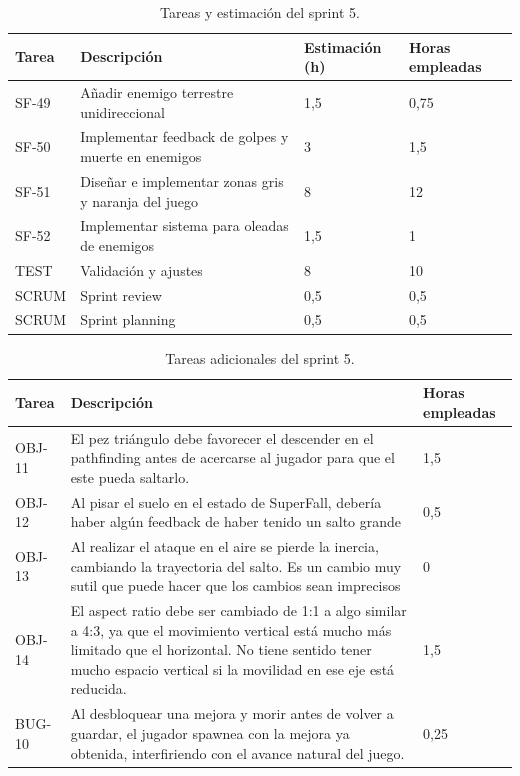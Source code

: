 \begin{table}[!ht]
    \centering
    \begin{tabular}{|l|p{8cm}|p{2cm}|p{2cm}|}
    \hline
        Tarea & Descripción & Estimación (h) & Horas empleadas \\ \hline
        SF-49 & Añadir enemigo terrestre unidireccional & 1,5 & 0,75 \\ \hline
        SF-50 & Implementar feedback de golpes y muerte en enemigos & 3 & 1,5 \\ \hline
        SF-51 & Diseñar e implementar zonas gris y naranja del juego & 8 & 12 \\ \hline
        SF-52 & Implementar sistema para oleadas de enemigos & 1,5 & 1 \\ \hline
        TEST & Validación y ajustes & 8 & 10 \\ \hline
        SCRUM & Sprint review & 0,5 & 0,5 \\ \hline
        SCRUM & Sprint planning & 0,5 & 0,5 \\ \hline
    \end{tabular}
    \caption{Tareas y estimación del sprint 5.}
    \label{tab:sprint5task}
\end{table}

\begin{table}[!ht]
    \centering
    \begin{tabular}{|l|p{8cm}|l|}
    \hline
        Tarea & Descripción & Horas empleadas \\ \hline
        OBJ-11 & El pez triángulo debe favorecer el descender en el pathfinding antes de acercarse al jugador para que el este pueda saltarlo. & 1,5 \\ \hline
        OBJ-12 & Al pisar el suelo en el estado de SuperFall, debería haber algún feedback de haber tenido un salto grande & 0,5 \\ \hline
        OBJ-13 & Al realizar el ataque en el aire se pierde la inercia, cambiando la trayectoria del salto. Es un cambio muy sutil que puede hacer que los cambios sean imprecisos & 0 \\ \hline
        OBJ-14 & El aspect ratio debe ser cambiado de 1:1 a algo similar a 4:3, ya que el movimiento vertical está mucho más limitado que el horizontal. No tiene sentido tener mucho espacio vertical si la movilidad en ese eje está reducida. & 1,5 \\ \hline
        BUG-10 & Al desbloquear una mejora y morir antes de volver a guardar, el jugador spawnea con la mejora ya obtenida, interfiriendo con el avance natural del juego. & 0,25 \\ \hline
    \end{tabular}
    \caption{Tareas adicionales del sprint 5.}
    \label{tab:aditionalsprint5task}
\end{table}


